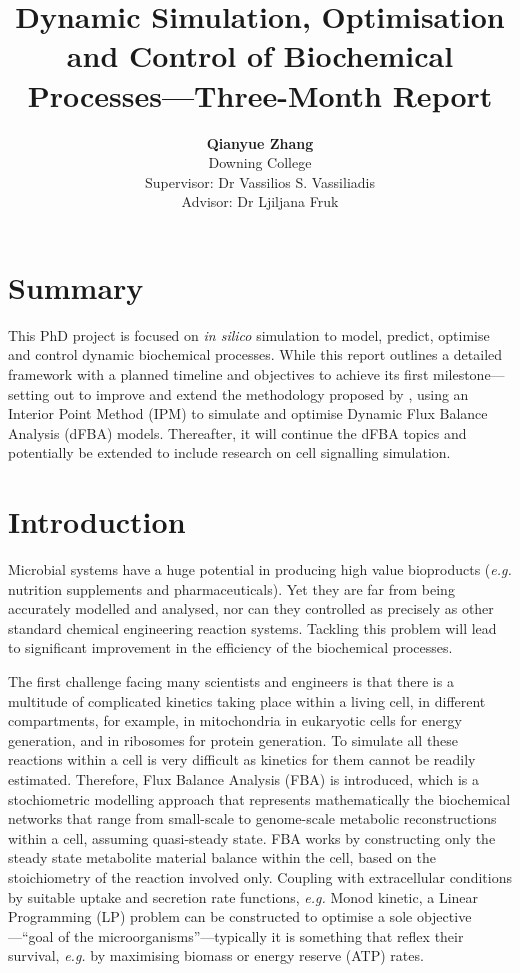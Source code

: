 \documentclass[11pt,a4paper,english]{article}
\title{\textbf{Dynamic Simulation, Optimisation and Control of Biochemical Processes—Three-Month Report}}
\author{\textbf{Qianyue Zhang}\\
Downing College\\
Supervisor: Dr Vassilios S. Vassiliadis\\
Advisor: Dr Ljiljana Fruk}
\begin{document}
\maketitle
\thispagestyle{fancy}
\section*{Summary}
This PhD project is focused on \textit{in silico} simulation to model, predict, optimise and control dynamic biochemical processes. While this report outlines a detailed framework with a planned timeline and objectives to achieve its first milestone—setting out to improve and extend the methodology proposed by \citet{scott2018simulation}, using an Interior Point Method (IPM) to simulate and optimise Dynamic Flux Balance Analysis (dFBA) models. Thereafter, it will continue the dFBA topics and potentially be extended to include research on cell signalling simulation.
\section*{Introduction}
Microbial systems have a huge potential in producing high value bioproducts (\textit{e.g.} nutrition supplements and pharmaceuticals). Yet they are far from being accurately modelled and analysed, nor can they controlled as precisely as other standard chemical engineering reaction systems.  Tackling this problem will lead to significant improvement in the efficiency of the biochemical processes.

The first challenge facing many scientists and engineers is that there is a multitude of complicated kinetics taking place within a living cell, in different compartments, for example, in mitochondria in eukaryotic cells for energy generation, and in ribosomes for protein generation. To simulate all these reactions within a cell is very difficult as kinetics for them cannot be readily estimated. Therefore, Flux Balance Analysis (FBA) is introduced, which is a stochiometric modelling approach that represents mathematically the biochemical networks that range from small-scale to genome-scale metabolic reconstructions within a cell, assuming quasi-steady state. FBA works by constructing only the steady state metabolite material balance within the cell, based on the stoichiometry of the reaction involved only. Coupling with extracellular conditions by suitable uptake and secretion rate functions, \textit{e.g.} Monod kinetic, a Linear Programming (LP) problem can be constructed to optimise a sole objective—“goal of the microorganisms”—typically it is something that reflex their survival, \textit{e.g.} by maximising biomass or energy reserve (ATP) rates.
\end{document}
